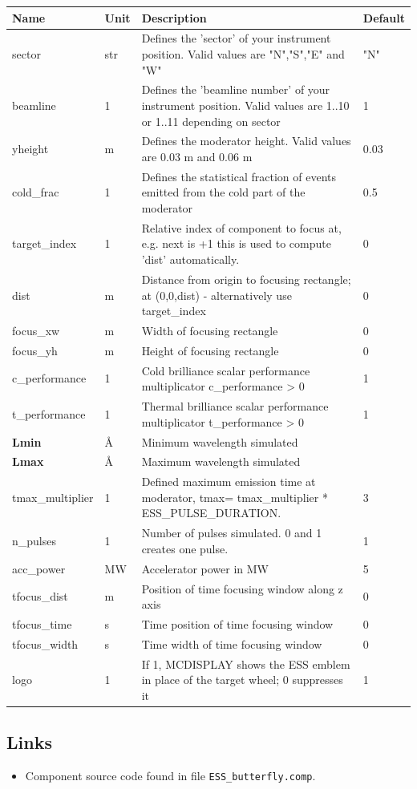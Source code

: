 \begin{longtable}{p{}p{}p{}p{}}
\toprule
\textbf{Name} & \textbf{Unit} & \textbf{Description} & \textbf{Default} \\
\midrule
\endhead
sector & str & Defines the 'sector' of your instrument position. Valid values are "N","S","E" and "W" & "N" \\
beamline & 1 & Defines the 'beamline number' of your instrument position. Valid values are 1..10 or 1..11 depending on sector & 1 \\
yheight & m & Defines the moderator height. Valid values are 0.03 m and 0.06 m & 0.03 \\
cold\_frac & 1 & Defines the statistical fraction of events emitted from the cold part of the moderator & 0.5 \\
target\_index & 1 & Relative index of component to focus at, e.g. next is +1 this is used to compute 'dist' automatically. & 0 \\
dist & m & Distance from origin to focusing rectangle; at (0,0,dist) - alternatively use target\_index & 0 \\
focus\_xw & m & Width of focusing rectangle & 0 \\
focus\_yh & m & Height of focusing rectangle & 0 \\
c\_performance & 1 & Cold brilliance scalar performance multiplicator c\_performance \textgreater{} 0 & 1 \\
t\_performance & 1 & Thermal brilliance scalar performance multiplicator t\_performance \textgreater{} 0 & 1 \\
\textbf{Lmin} & \AA{} & Minimum wavelength simulated &  \\
\textbf{Lmax} & \AA{} & Maximum wavelength simulated &  \\
tmax\_multiplier & 1 & Defined maximum emission time at moderator, tmax= tmax\_multiplier * ESS\_PULSE\_DURATION. & 3 \\
n\_pulses & 1 & Number of pulses simulated. 0 and 1 creates one pulse. & 1 \\
acc\_power & MW & Accelerator power in MW & 5 \\
tfocus\_dist & m & Position of time focusing window along z axis & 0 \\
tfocus\_time & s & Time position of time focusing window & 0 \\
tfocus\_width & s & Time width of time focusing window & 0 \\
logo & 1 & If 1, MCDISPLAY shows the ESS emblem in place of the target wheel; 0 suppresses it & 1 \\
\bottomrule
\end{longtable}

\subsection*{Links}
\begin{itemize}
  \item Component source code found in file \texttt{ESS\_butterfly.comp}.
\end{itemize}
